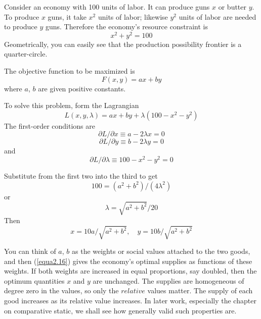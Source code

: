 Consider an economy with 100 units of labor. It can produce guns $x$ or butter $y$. To produce $x$ guns, it take $x^2$ units of labor; likewise $y^2$ units of labor are needed to produce $y$ guns. Therefore the economy's resource constraint is 
\begin{equation*}
x^2 + y^2 =100
\end{equation*}
Geometrically, you can easily see that the production possibility frontier is a quarter-circle.

The objective function to be maximized is 
\begin{equation*}
F(x,y ) = ax + by
\end{equation*}
where $a$, $b$ are given positive constants.

To solve this problem, form the Lagrangian
\begin{equation*}
L(x,y,\lambda) = ax + by + \lambda(100- x^2 - y^2)
\end{equation*}
The first-order conditions are 
\begin{equation*}
\partial L / \partial x \equiv a - 2 \lambda x = 0  
\end{equation*}
\begin{equation*}
\partial L / \partial y \equiv b - 2 \lambda y = 0
\end{equation*}
and
\begin{equation*}
\partial L / \partial \lambda \equiv 100 - x^2 - y^2 = 0
\end{equation*}

Substitute from the first two into the third to get
\begin{equation*}
100 = (a^2 + b^2) / (4 \lambda^2) 
\end{equation*}
or
\begin{equation*}
\lambda = \sqrt{a^2 + b^2} / 20 
\end{equation*}
Then
\begin{equation} \label{equa2.16}
x = 10a / \sqrt{a^2 + b^2}, \quad   y = 10b / \sqrt{a^2 + b^2}
\end{equation}

You can think of $a$, $b$ as the weights or social values attached to the two goods, and then (\ref{equa2.16}) gives the economy's optimal supplies as functions of these weights. If both weights are increased in equal proportions, say doubled, then the optimum quantities $x$ and $y$ are unchanged. The supplies are homogeneous of degree zero in the values, so only the $relative$ values matter. The supply of each good increases as its relative value increases. In later work, especially the chapter on comparative static, we shall see how generally valid such properties are.

